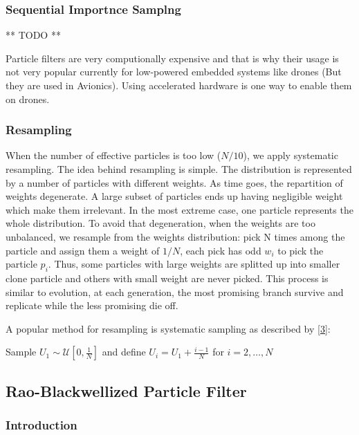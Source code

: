 \documentclass[12pt,]{article}
\begin{document}
\subsubsection{Sequential Importnce
Samplng}\label{sequential-importnce-samplng}

** TODO **

Particle filters are very computionally expensive and that is why their
usage is not very popular currently for low-powered embedded systems
like drones (But they are used in Avionics). Using accelerated hardware
is one way to enable them on drones.

\subsubsection{Resampling}\label{resampling}

When the number of effective particles is too low (\(N/10\)), we apply
systematic resampling. The idea behind resampling is simple. The
distribution is represented by a number of particles with different
weights. As time goes, the repartition of weights degenerate. A large
subset of particles ends up having negligible weight which make them
irrelevant. In the most extreme case, one particle represents the whole
distribution. To avoid that degeneration, when the weights are too
unbalanced, we resample from the weights distribution: pick N times
among the particle and assign them a weight of \(1/N\), each pick has
odd \(w_i\) to pick the particle \(p_i\). Thus, some particles with
large weights are splitted up into smaller clone particle and others
with small weight are never picked. This process is similar to
evolution, at each generation, the most promising branch survive and
replicate while the less promising die off.

A popular method for resampling is systematic sampling as described by
{[}\protect\hyperlink{ref-doucet_tutorial_2009}{3}{]}:

Sample \(U_1 \sim \mathcal{U} [0, \frac{1}{N} ]\) and define
\(U_i = U_1 + \frac{i-1 }{N}\) for \(i = 2, \ldots, N\)

\subsection{Rao-Blackwellized Particle
Filter}\label{rao-blackwellized-particle-filter}

\subsubsection{Introduction}\label{introduction-1}
\end{document}

